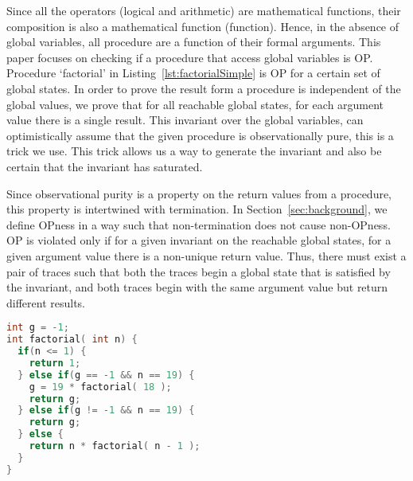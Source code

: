 \documentclass{llncs}
\begin{document}
Since all the operators (logical and arithmetic) are mathematical
functions, their composition is also a mathematical function
(function). Hence, in the absence of global variables, all procedure
are a function of their formal arguments. This paper focuses on
checking if a procedure that access global variables is OP. Procedure
`factorial' in Listing~\ref{lst:factorialSimple} is OP for a certain
set of global states.  In order to prove the result form a procedure
is independent of the global values, we prove that for all reachable
global states, for each argument value there is a single result. This
invariant over the global variables, can optimistically assume that
the given procedure is observationally pure, this is a trick we
use. This trick allows us a way to generate the invariant and also be
certain that the invariant has saturated. 



Since observational purity is a property on the return values from a
procedure, this property is intertwined with termination. In
Section~\ref{sec:background}, we define OPness in a way such that
non-termination does not cause non-OPness. OP is violated only if for
a given invariant on the reachable global states, for a given argument
value there is a non-unique return value. Thus, there must exist a
pair of traces such that both the traces begin a global state that is
satisfied by the invariant, and both traces begin with the same
argument value but return different results.


\begin{lstlisting}[language=c, caption= {Procedure `factorial' :
      returns factorial of `n' and memoizes result for argument value
      `19'.}, label=lst:factorialSimple]
int g = -1;
int factorial( int n) {
  if(n <= 1) {
    return 1;
  } else if(g == -1 && n == 19) {
    g = 19 * factorial( 18 );
    return g;
  } else if(g != -1 && n == 19) {
    return g;
  } else {
    return n * factorial( n - 1 );
  }
}
\end{lstlisting}

\end{document}
